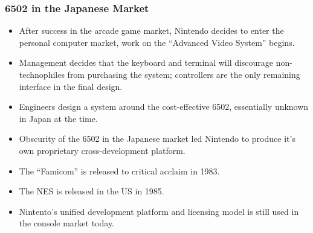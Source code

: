 \documentclass{beamer}
\begin{document}
\begin{frame}
\frametitle{6502 in the Japanese Market}
\begin{itemize}
\item After success in the arcade game market, Nintendo decides to enter the personal computer market, work on the ``Advanced Video System'' begins.
\item Management decides that the keyboard and terminal will discourage non-technophiles from purchasing the system; controllers are the only remaining interface in the final design.
\item Engineers design a system around the cost-effective 6502, essentially unknown in Japan at the time.
\item Obscurity of the 6502 in the Japanese market led Nintendo to produce it's own proprietary cross-development platform.
\item The ``Famicom'' is released to critical acclaim in 1983.
\item The NES is released in the US in 1985.
\item Nintento's unified development platform and licensing model is still used in the console market today.
\end{itemize}
\end{frame}
\end{document}
